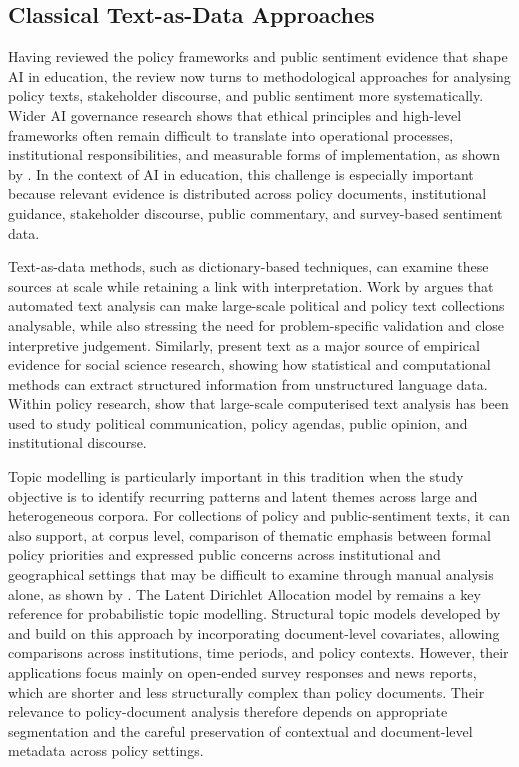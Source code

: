 \subsection{Classical Text-as-Data Approaches}

Having reviewed the policy frameworks and public sentiment evidence that shape AI in
education, the review now turns to methodological approaches for analysing policy
texts, stakeholder discourse, and public sentiment more systematically. Wider AI
governance research shows that ethical principles and high-level frameworks often
remain difficult to translate into operational processes, institutional
responsibilities, and measurable forms of implementation, as shown by
\cite{birkstedt2023ai}. In the context of AI in education, this challenge is
especially important because relevant evidence is distributed across policy
documents, institutional guidance, stakeholder discourse, public commentary, and
survey-based sentiment data.

Text-as-data methods, such as dictionary-based techniques, can examine these sources
at scale while retaining a link with interpretation. Work by \cite{grimmer2013text}
argues that automated text analysis can make large-scale political and policy text
collections analysable, while also stressing the need for problem-specific validation
and close interpretive judgement. Similarly, \cite{gentzkow2019text} present text as
a major source of empirical evidence for social science research, showing how
statistical and computational methods can extract structured information from
unstructured language data. Within policy research, \cite{wilkerson2017large} show
that large-scale computerised text analysis has been used to study political
communication, policy agendas, public opinion, and institutional discourse.

Topic modelling is particularly important in this tradition when the study objective
is to identify recurring patterns and latent themes across large and heterogeneous
corpora. For collections of policy and public-sentiment texts, it can also support,
at corpus level, comparison of thematic emphasis between formal policy priorities and
expressed public concerns across institutional and geographical settings that may be
difficult to examine through manual analysis alone, as shown by
\cite{isoaho2021topic}. The Latent Dirichlet Allocation model by
\cite{blei2003latent} remains a key reference for probabilistic topic modelling.
Structural topic models developed by \cite{roberts2014structural} and
\cite{roberts2016model} build on this approach by incorporating document-level
covariates, allowing comparisons across institutions, time periods, and policy
contexts. However, their applications focus mainly on open-ended survey responses and
news reports, which are shorter and less structurally complex than policy documents.
Their relevance to policy-document analysis therefore depends on appropriate
segmentation and the careful preservation of contextual and document-level metadata
across policy settings.

